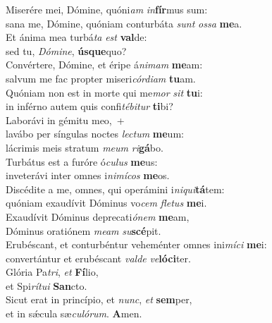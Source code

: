 \evenverse Miserére mei, Dómine, quóni\textit{am} \textit{in}\textbf{fír}mus sum:~\*\\
\evenverse sana me, Dómine, quóniam conturbáta \textit{sunt} \textit{os}\textit{sa} \textbf{me}a.\\
\oddverse Et ánima mea turbá\textit{ta} \textit{est} \textbf{val}de:~\*\\
\oddverse sed tu, \textit{Dó}\textit{mi}\textit{ne}, \textbf{ús}\textbf{que}quo?\\
\evenverse Convértere, Dómine, et éripe á\textit{ni}\textit{mam} \textbf{me}am:~\*\\
\evenverse salvum me fac propter miseri\textit{cór}\textit{di}\textit{am} \textbf{tu}am.\\
\oddverse Quóniam non est in morte qui me\textit{mor} \textit{sit} \textbf{tu}i:~\*\\
\oddverse in inférno autem quis confi\textit{té}\textit{bi}\textit{tur} \textbf{ti}bi?\\
\evenverse Laborávi in gémitu meo,~+\\
\evenverse  lavábo per síngulas noctes \textit{le}\textit{ctum} \textbf{me}um:~\*\\
\evenverse lácrimis meis stratum \textit{me}\textit{um} \textit{ri}\textbf{gá}bo.\\
\oddverse Turbátus est a furóre ó\textit{cu}\textit{lus} \textbf{me}us:~\*\\
\oddverse inveterávi inter omnes i\textit{ni}\textit{mí}\textit{cos} \textbf{me}os.\\
\evenverse Discédite a me, omnes, qui operámini i\textit{ni}\textit{qui}\textbf{tá}tem:~\*\\
\evenverse quóniam exaudívit Dóminus vo\textit{cem} \textit{fle}\textit{tus} \textbf{me}i.\\
\oddverse Exaudívit Dóminus deprecati\textit{ó}\textit{nem} \textbf{me}am,~\*\\
\oddverse Dóminus oratiónem \textit{me}\textit{am} \textit{su}\textbf{scé}pit.\\
\evenverse Erubéscant, et conturbéntur veheménter omnes ini\textit{mí}\textit{ci} \textbf{me}i:~\*\\
\evenverse convertántur et erubéscant \textit{val}\textit{de} \textit{ve}\textbf{ló}\textbf{ci}ter.\\
\oddverse Glória Pa\textit{tri}, \textit{et} \textbf{Fí}lio,~\*\\
\oddverse et Spi\textit{rí}\textit{tu}\textit{i} \textbf{San}cto.\\
\evenverse Sicut erat in princípio, et \textit{nunc}, \textit{et} \textbf{sem}per,~\*\\
\evenverse et in sǽcula sæ\textit{cu}\textit{ló}\textit{rum}. \textbf{A}men.\\
